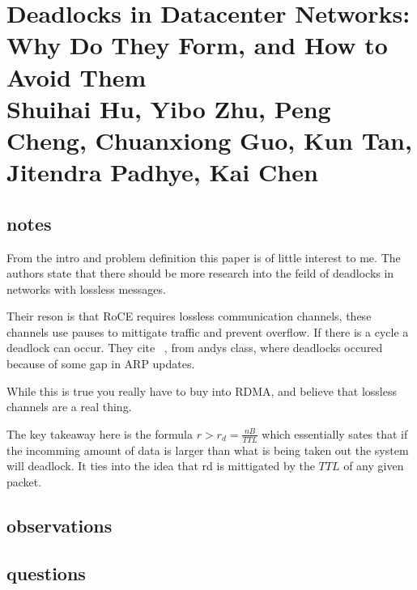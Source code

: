 \section{Deadlocks in Datacenter Networks: Why Do They Form, and How to Avoid Them \\ \small{Shuihai Hu, Yibo Zhu, Peng Cheng, Chuanxiong Guo, Kun Tan, Jitendra Padhye, Kai Chen}}

\subsection{notes}

From the intro and problem definition this paper is of little interest to me. The authors state that there should be more research into the feild of deadlocks in networks with lossless messages.

Their reson is that RoCE requires lossless communication channels, these
channels use pauses to mittigate traffic and prevent overflow. If there is a
cycle a deadlock can occur. They cite ~\cite{rdma-commodity-ethernet-scale},
from andys class, where deadlocks occured because of some gap in ARP updates.

While this is true you really have to buy into RDMA, and believe that lossless channels are a real thing.

The key takeaway here is the formula $r > r_d = \frac{nB}{TTL}$ which
essentially sates that if the incomming amount of data is larger than what is
being taken out the system will deadlock. It ties into the idea that rd is
mittigated by the $TTL$ of any given packet.

\subsection{observations}

\subsection{questions}
